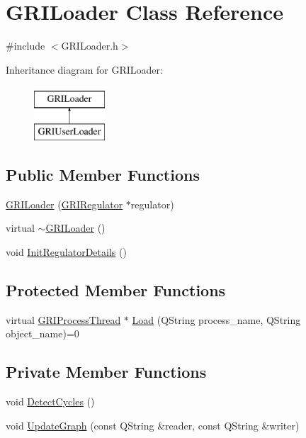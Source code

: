 \hypertarget{classGRILoader}{\section{\-G\-R\-I\-Loader \-Class \-Reference}
\label{classGRILoader}
}


{\ttfamily \#include $<$\-G\-R\-I\-Loader.\-h$>$}

\-Inheritance diagram for \-G\-R\-I\-Loader\-:\begin{figure}[H]
\begin{center}
\leavevmode
\includegraphics[height=2.000000cm]{classGRILoader}
\end{center}
\end{figure}
\subsection*{\-Public \-Member \-Functions}
\begin{DoxyCompactItemize}
\item 
\hyperlink{classGRILoader_a2a5f8429fab28b6a2c37f909f9402160}{\-G\-R\-I\-Loader} (\hyperlink{classGRIRegulator}{\-G\-R\-I\-Regulator} $\ast$regulator)
\item 
virtual \hyperlink{classGRILoader_a4efe8ca296da5e985570ba7552f611fe}{$\sim$\-G\-R\-I\-Loader} ()
\item 
void \hyperlink{classGRILoader_afaf6662605f0318bf9ec489281f2f02c}{\-Init\-Regulator\-Details} ()
\end{DoxyCompactItemize}
\subsection*{\-Protected \-Member \-Functions}
\begin{DoxyCompactItemize}
\item 
virtual \hyperlink{classGRIProcessThread}{\-G\-R\-I\-Process\-Thread} $\ast$ \hyperlink{classGRILoader_a7f291c62743327222e6671b6bcb946e3}{\-Load} (\-Q\-String process\-\_\-name, \-Q\-String object\-\_\-name)=0
\end{DoxyCompactItemize}
\subsection*{\-Private \-Member \-Functions}
\begin{DoxyCompactItemize}
\item 
void \hyperlink{classGRILoader_a053cdaf91d58597a72bb8d37a92aada2}{\-Detect\-Cycles} ()
\item 
void \hyperlink{classGRILoader_a046f82faeda529ab99281dff17045ece}{\-Update\-Graph} (const \-Q\-String \&reader, const \-Q\-String \&writer)
\end{DoxyCompactItemize}

